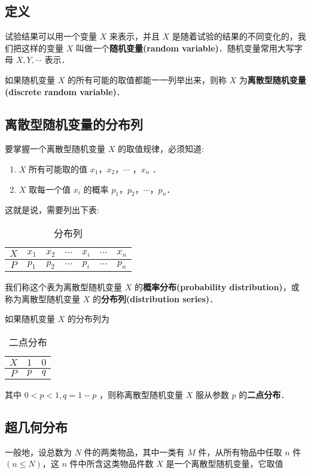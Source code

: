 

\subsection{定义}
试验结果可以用一个变量 $X$ 来表示，并且 $X$ 是随着试验的结果的不同变化的，我们把这样的变量 $X$ 叫做一个\textbf{随机变量(random variable)}．随机变量常用大写字母 $X,Y,\cdots$ 表示．

如果随机变量  $X$ 的所有可能的取值都能一一列举出来，则称 $X$ 为\textbf{离散型随机变量(discrete random variable)}．

\subsection{离散型随机变量的分布列}
要掌握一个离散型随机变量 $X$ 的取值规律，必须知道:
\begin{enumerate}
\item $X$ 所有可能取的值 $x_1$，$x_2$，$\cdots$ ，$x_n$ ．
\item $X$ 取每一个值 $x_i$ 的概率 $p_1$，$p_2$，$\cdots$，$p_n$．
\end{enumerate}
这就是说，需要列出下表:

\begin{table}[ht]
\centering
\caption{分布列}\label{HsDRV_tab1}
\begin{tabular}{|c|c|c|c|c|c|c|}
\hline
$X$ & $x_1$ & $x_2$ & $\cdots$ & $x_i$ & $\cdots$ & $x_n$ \\
\hline
$P$ & $p_1$ & $p_2$ & $\cdots$ & $p_i$ & $\cdots$ & $p_n$ \\
\hline
\end{tabular}
\end{table}
我们称这个表为离散型随机变量 $X$ 的\textbf{概率分布(probability distribution)}，或称为离散型随机变量 $X$ 的\textbf{分布列(distribution series)}．

如果随机变量 $X$ 的分布列为

\begin{table}[ht]
\centering
\caption{二点分布}\label{HsDRV_tab2}
\begin{tabular}{|c|c|c|}
\hline
$X$ & $1$ & $0$ \\
\hline
$P$ & $p$ & $q$ \\
\hline
\end{tabular}
\end{table}
其中 $0<p<1,q=1-p$ ，则称离散型随机变量 $X$ 服从参数 $p$ 的\textbf{二点分布}．

\subsection{超几何分布}
一般地，设总数为 $N$ 件的两类物品，其中一类有 $M$ 件，从所有物品中任取 $n$ 件 $(n\leqslant N)$，这 $n$ 件中所含这类物品件数 $X$ 是一个离散型随机变量，它取值